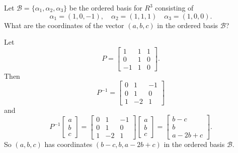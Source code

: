  Let $\mathcal{B} = \{\alpha_1, \alpha_2, \alpha_3\}$ be the
ordered basis for $R^3$ consisting of
\begin{equation*}
  \alpha_1 = (1, 0, -1), \quad
  \alpha_2 = (1, 1, 1) \quad
  \alpha_3 = (1, 0, 0).
\end{equation*}
What are the coordinates of the vector $(a, b, c)$ in the ordered
basis $\mathcal{B}$?
\begin{solution}
  Let
  \begin{equation*}
    P =
    \begin{bmatrix}
      1 & 1 & 1 \\
      0 & 1 & 0 \\
      -1 & 1 & 0
    \end{bmatrix}.
  \end{equation*}
  Then
  \begin{equation*}
    P^{-1} =
    \begin{bmatrix}
      0 & 1 & -1 \\
      0 & 1 & 0 \\
      1 & -2 & 1
    \end{bmatrix}
  \end{equation*}
  and
  \begin{equation*}
    P^{-1}
    \begin{bmatrix}
      a \\ b \\ c
    \end{bmatrix}
    =
    \begin{bmatrix}
      0 & 1 & -1 \\
      0 & 1 & 0 \\
      1 & -2 & 1
    \end{bmatrix}
    \begin{bmatrix}
      a \\ b \\ c
    \end{bmatrix}
    =
    \begin{bmatrix}
      b - c \\ b \\ a - 2b + c
    \end{bmatrix}.
  \end{equation*}
  So $(a,b,c)$ has coordinates $(b - c, b, a - 2b + c)$ in the ordered
  basis $\mathcal{B}$.
\end{solution}
